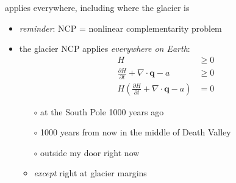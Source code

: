 \documentclass[10pt,hyperref,dvipsnames]{beamer}
\newcommand{\bq}{\mathbf{q}}
\newcommand{\Div}{\nabla\cdot}
\begin{document}
\begin{frame}{applies everywhere, including where the glacier is}
\begin{itemize}
\item \emph{reminder}: NCP = nonlinear complementarity problem
\item the glacier NCP applies \emph{everywhere on Earth}:
\begin{align*}
H &\ge 0 \\
\frac{\partial H}{\partial t} + \Div \bq - a &\ge 0 \\
H \left(\frac{\partial H}{\partial t} + \Div \bq - a\right) &= 0
\end{align*}
    \begin{itemize}
    \item[$\circ$] at the South Pole 1000 years ago
    \item[$\circ$] 1000 years from now in the middle of Death Valley
    \item[$\circ$] outside my door right now

    \medskip
    \item<2>[$\circ$] \emph{except} right at glacier margins
    \end{itemize}
\end{itemize}
\end{frame}
\end{document}
